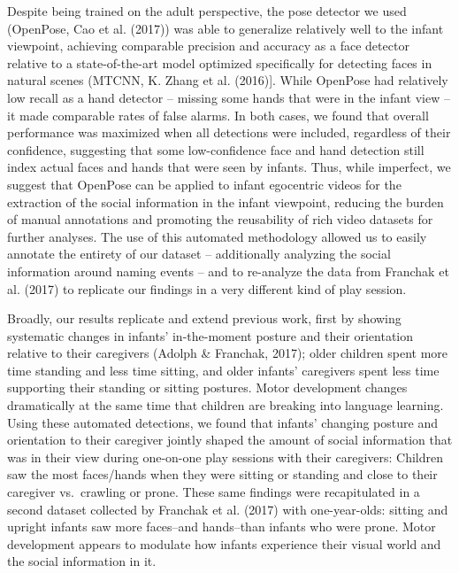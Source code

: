 \documentclass[english,man]{apa6}
\begin{document}
Despite being trained on the adult perspective, the pose detector we
used (OpenPose, Cao et al. (2017)) was able to generalize relatively
well to the infant viewpoint, achieving comparable precision and
accuracy as a face detector relative to a state-of-the-art model
optimized specifically for detecting faces in natural scenes (MTCNN, K.
Zhang et al. (2016){]}. While OpenPose had relatively low recall as a
hand detector -- missing some hands that were in the infant view -- it
made comparable rates of false alarms. In both cases, we found that
overall performance was maximized when all detections were included,
regardless of their confidence, suggesting that some low-confidence face
and hand detection still index actual faces and hands that were seen by
infants. Thus, while imperfect, we suggest that OpenPose can be applied
to infant egocentric videos for the extraction of the social information
in the infant viewpoint, reducing the burden of manual annotations and
promoting the reusability of rich video datasets for further analyses.
The use of this automated methodology allowed us to easily annotate the
entirety of our dataset -- additionally analyzing the social information
around naming events -- and to re-analyze the data from Franchak et al.
(2017) to replicate our findings in a very different kind of play
session.

Broadly, our results replicate and extend previous work, first by
showing systematic changes in infants' in-the-moment posture and their
orientation relative to their caregivers (Adolph \& Franchak, 2017);
older children spent more time standing and less time sitting, and older
infants' caregivers spent less time supporting their standing or sitting
postures. Motor development changes dramatically at the same time that
children are breaking into language learning. Using these automated
detections, we found that infants' changing posture and orientation to
their caregiver jointly shaped the amount of social information that was
in their view during one-on-one play sessions with their caregivers:
Children saw the most faces/hands when they were sitting or standing and
close to their caregiver vs.~crawling or prone. These same findings were
recapitulated in a second dataset collected by Franchak et al. (2017)
with one-year-olds: sitting and upright infants saw more faces--and
hands--than infants who were prone. Motor development appears to
modulate how infants experience their visual world and the social
information in it.
\end{document}
